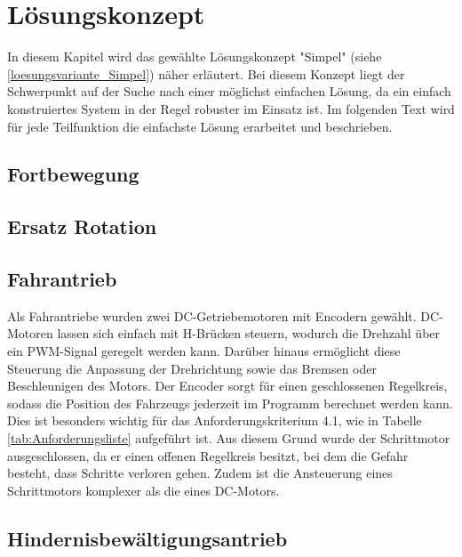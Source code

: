 \documentclass[../main.tex]{subfiles}
\begin{document}
\newpage
\section{Lösungskonzept}

In diesem Kapitel wird das gewählte Lösungskonzept "Simpel" (siehe \ref{loesungsvariante_Simpel}) näher erläutert. Bei diesem Konzept liegt der Schwerpunkt auf der Suche nach einer möglichst einfachen Lösung, da ein einfach konstruiertes System in der Regel robuster im Einsatz ist. Im folgenden Text wird für jede Teilfunktion die einfachste Lösung erarbeitet und beschrieben.

\subsection{Fortbewegung}



\subsection{Ersatz Rotation}    %



\subsection{Fahrantrieb}
Als Fahrantriebe wurden zwei DC-Getriebemotoren mit Encodern gewählt. DC-Motoren lassen sich einfach mit H-Brücken steuern, wodurch die Drehzahl über ein PWM-Signal geregelt werden kann. Darüber hinaus ermöglicht diese Steuerung die Anpassung der Drehrichtung sowie das Bremsen oder Beschleunigen des Motors. Der Encoder sorgt für einen geschlossenen Regelkreis, sodass die Position des Fahrzeugs jederzeit im Programm berechnet werden kann. Dies ist besonders wichtig für das Anforderungskriterium 4.1, wie in Tabelle \ref{tab:Anforderungsliste} aufgeführt ist. Aus diesem Grund wurde der Schrittmotor ausgeschlossen, da er einen offenen Regelkreis besitzt, bei dem die Gefahr besteht, dass Schritte verloren gehen. Zudem ist die Ansteuerung eines Schrittmotors komplexer als die eines DC-Motors.


\subsection{Hindernisbewältigungsantrieb}
\end{document}
